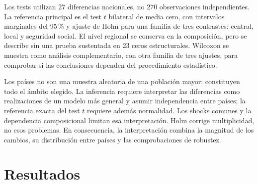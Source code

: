 \documentclass[11pt,a4paper]{article}
\begin{document}
Los tests utilizan 27 diferencias nacionales, no 270 observaciones independientes. La referencia principal es el test $t$ bilateral de media cero, con intervalos marginales del 95\,\% y ajuste de Holm para una familia de tres contrastes: central, local y seguridad social. El nivel regional se conserva en la composición, pero se describe sin una prueba sustentada en 23 ceros estructurales. Wilcoxon se muestra como análisis complementario, con otra familia de tres ajustes, para comprobar si las conclusiones dependen del procedimiento estadístico.

Los países no son una muestra aleatoria de una población mayor: constituyen todo el ámbito elegido. La inferencia requiere interpretar las diferencias como realizaciones de un modelo más general y asumir independencia entre países; la referencia exacta del test $t$ requiere además normalidad. Los shocks comunes y la dependencia composicional limitan esa interpretación. Holm corrige multiplicidad, no esos problemas. En consecuencia, la interpretación combina la magnitud de los cambios, su distribución entre países y las comprobaciones de robustez.

\section{Resultados}
\end{document}

